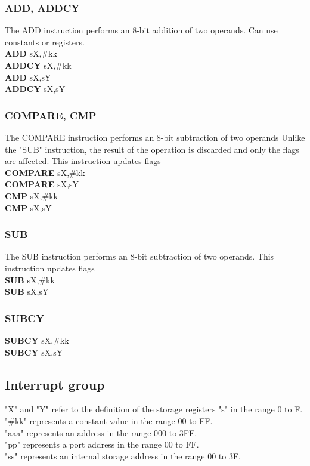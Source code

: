         \subsubsection{ADD, ADDCY}
            The ADD instruction performs an 8-bit addition of two operands. Can use constants or registers.\\
            \textbf{ADD} sX,\#kk\\
            \textbf{ADDCY} sX,\#kk\\
            \textbf{ADD} sX,sY\\
            \textbf{ADDCY} sX,sY\\

        \subsubsection{COMPARE, CMP}
            The COMPARE instruction performs an 8-bit subtraction of two operands Unlike the "SUB" instruction, the result of the operation is
            discarded and only the flags are affected. This instruction updates flags\\
            \textbf{COMPARE} sX,\#kk\\
            \textbf{COMPARE} sX,sY\\
            \textbf{CMP}     sX,\#kk\\
            \textbf{CMP}     sX,sY\\

        \subsubsection{SUB}
            The SUB instruction performs an 8-bit subtraction of two operands. This instruction updates flags\\
            \textbf{SUB} sX,\#kk\\
            \textbf{SUB} sX,sY\\

        \subsubsection{SUBCY}
            \textbf{SUBCY} sX,\#kk\\
            \textbf{SUBCY} sX,sY\\

        \subsection{Interrupt group}
            "X" and "Y" refer to the definition of the storage registers "s" in the range 0 to F.\\
            "\#kk" represents a constant value in the range 00 to FF.\\
            "aaa" represents an address in the range 000 to 3FF.\\
            "pp" represents a port address in the range 00 to FF.\\
            "ss" represents an internal storage address in the range 00 to 3F.\\

